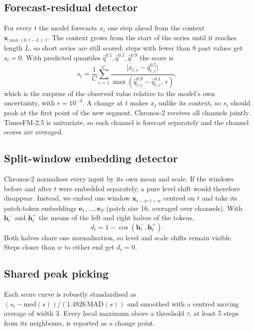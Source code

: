 \documentclass[conference]{IEEEtran}
\begin{document}
\subsection{Forecast-residual detector}
For every $t$ the model forecasts $x_t$ one step ahead from the context $\mathbf{x}_{\max(0,t-L):t}$. The context grows from the start of the series until it reaches length $L$, so short series are still scored; steps with fewer than 8 past values get $s_t=0$. With predicted quantiles $\hat q^{0.1}, \hat q^{0.5}, \hat q^{0.9}$ the score is
\begin{equation}
s_t = \frac{1}{C}\sum_{c=1}^{C}\frac{\lvert x_{t,c}-\hat q^{0.5}_{t,c}\rvert}{\max\left(\hat q^{0.9}_{t,c}-\hat q^{0.1}_{t,c},\,\epsilon\right)},
\end{equation}
which is the surprise of the observed value relative to the model's own uncertainty, with $\epsilon=10^{-3}$. A change at $t$ makes $x_t$ unlike its context, so $s_t$ should peak at the first point of the new segment. Chronos-2 receives all channels jointly. TimesFM-2.5 is univariate, so each channel is forecast separately and the channel scores are averaged.

\subsection{Split-window embedding detector}
Chronos-2 normalises every input by its own mean and scale. If the windows before and after $t$ were embedded separately, a pure level shift would therefore disappear. Instead, we embed one window $\mathbf{x}_{t-w:t+w}$ centred on $t$ and take its patch-token embeddings $\mathbf{e}_1,\dots,\mathbf{e}_P$ (patch size 16, averaged over channels). With $\mathbf{h}^-_t$ and $\mathbf{h}^+_t$ the means of the left and right halves of the tokens,
\begin{equation}
d_t = 1-\cos\left(\mathbf{h}^-_t,\mathbf{h}^+_t\right).
\end{equation}
Both halves share one normalisation, so level and scale shifts remain visible. Steps closer than $w$ to either end get $d_t=0$.

\subsection{Shared peak picking}\label{sec:peaks}
Each score curve is robustly standardised as $(s_t-\mathrm{med}(s))/(1.4826\,\mathrm{MAD}(s))$ and smoothed with a centred moving average of width 3. Every local maximum above a threshold $\tau$, at least 5 steps from its neighbours, is reported as a change point.
\end{document}
